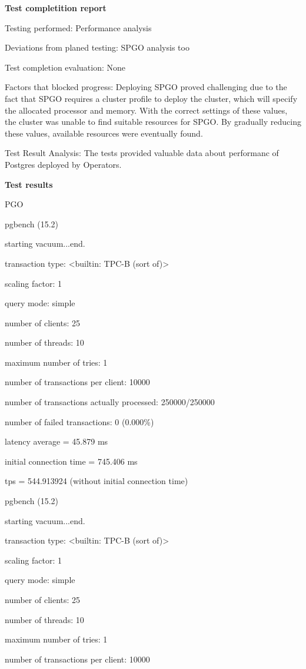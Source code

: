 \textbf{Test completition report}

Testing performed: Performance analysis

Deviations from planed testing: SPGO analysis too

Test completion evaluation: None

Factors that blocked progress: Deploying SPGO proved challenging due to the fact that SPGO requires a cluster profile to deploy the cluster, which will specify the allocated processor and memory. With the correct settings of these values, the cluster was unable to find suitable resources for SPGO. By gradually reducing these values, available resources were eventually found.

Test Result Analysis: The tests provided valuable data about performanc of Postgres deployed by Operators.

\textbf{Test results}

PGO

pgbench (15.2)

starting vacuum...end.

transaction type: <builtin: TPC-B (sort of)>

scaling factor: 1

query mode: simple

number of clients: 25

number of threads: 10

maximum number of tries: 1

number of transactions per client: 10000

number of transactions actually processed: 250000/250000

number of failed transactions: 0 (0.000\%)

latency average = 45.879 ms

initial connection time = 745.406 ms

tps = 544.913924 (without initial connection time)

pgbench (15.2)

starting vacuum...end.

transaction type: <builtin: TPC-B (sort of)>

scaling factor: 1

query mode: simple

number of clients: 25

number of threads: 10

maximum number of tries: 1

number of transactions per client: 10000


